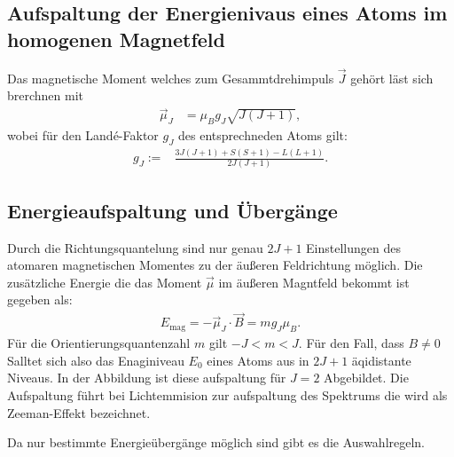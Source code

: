 \subsection{Aufspaltung der Energienivaus eines Atoms im homogenen Magnetfeld}
Das magnetische Moment welches zum Gesammtdrehimpuls $\vec{J}$ gehört läst sich brerchnen mit
\begin{align*}
  \vec{\mu}_J&=\mu_Bg_J\sqrt{J(J+1)},
\end{align*}
wobei für den Landé-Faktor $g_J$ des entsprechneden Atoms gilt:
\begin{align}
		g_J:=&\frac{3J(J+1)+S(S+1)-L(L+1)}{2J(J+1)}.
\end{align}

\subsection{Energieaufspaltung und Übergänge}
Durch die Richtungsquantelung sind nur genau $2J+1$ Einstellungen des atomaren magnetischen Momentes zu der äußeren Feldrichtung möglich.
Die zusätzliche Energie die das Moment $\vec{\mu}$ im äußeren Magntfeld bekommt ist gegeben als:
\begin{align*}
  E_{\text{mag}} = -\vec{\mu}_J \cdot \vec{B} = mg_J\mu_B.
\end{align*}
Für die Orientierungsquantenzahl $m$ gilt $-J < m < J$.
Für den Fall, dass $B \ne 0$ Salltet sich also das Enaginiveau $E_0$ eines Atoms aus in $2J+1$ äqidistante Niveaus.
In der Abbildung %
ist diese aufspaltung für $J = 2$ Abgebildet.
Die Aufspaltung führt bei Lichtemmision zur aufspaltung des Spektrums die wird als Zeeman-Effekt bezeichnet.

Da nur bestimmte Energieübergänge möglich sind gibt es die Auswahlregeln.

